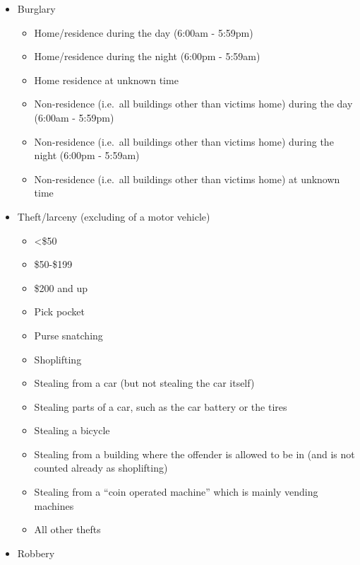 \documentclass[
  12pt,
  openany]{book}
\providecommand{\tightlist}{%
  \setlength{\itemsep}{0pt}\setlength{\parskip}{0pt}}
\begin{document}
\begin{itemize}
\tightlist
\item
  Burglary

  \begin{itemize}
  \tightlist
  \item
    Home/residence during the day (6:00am - 5:59pm)
  \item
    Home/residence during the night (6:00pm - 5:59am)
  \item
    Home residence at unknown time
  \item
    Non-residence (i.e.~all buildings other than victims home) during the day (6:00am - 5:59pm)
  \item
    Non-residence (i.e.~all buildings other than victims home) during the night (6:00pm - 5:59am)
  \item
    Non-residence (i.e.~all buildings other than victims home) at unknown time
  \end{itemize}
\item
  Theft/larceny (excluding of a motor vehicle)

  \begin{itemize}
  \tightlist
  \item
    \textless\$50
  \item
    \$50-\$199
  \item
    \$200 and up
  \item
    Pick pocket
  \item
    Purse snatching
  \item
    Shoplifting
  \item
    Stealing from a car (but not stealing the car itself)
  \item
    Stealing parts of a car, such as the car battery or the tires
  \item
    Stealing a bicycle
  \item
    Stealing from a building where the offender is allowed to be in (and is not counted already as shoplifting)
  \item
    Stealing from a ``coin operated machine'' which is mainly vending machines
  \item
    All other thefts
  \end{itemize}
\item
  Robbery


\end{itemize}
\end{document}
